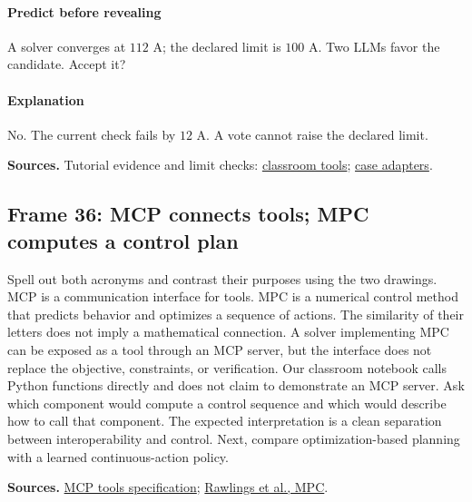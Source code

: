 \documentclass[11pt]{article}
\begin{document}
\paragraph{Predict before revealing}A solver converges at \(112\) A; the declared limit is \(100\) A. Two LLMs favor the candidate. Accept it?
\paragraph{Explanation}No. The current check fails by \(12\) A. A vote cannot raise the declared limit.
\par\nopagebreak\begin{minipage}{\linewidth}{\footnotesize\color{slate}\textbf{Sources.} Tutorial evidence and limit checks: \href{../src/classroom_labs.py}{classroom tools}; \href{../src/proposal_case_tools.py}{case adapters}.\par}\end{minipage}\par\medskip
\subsection*{Frame 36: MCP connects tools; MPC computes a control plan}
Spell out both acronyms and contrast their purposes using the two drawings. MCP is a communication interface for tools. MPC is a numerical control method that predicts behavior and optimizes a sequence of actions. The similarity of their letters does not imply a mathematical connection. A solver implementing MPC can be exposed as a tool through an MCP server, but the interface does not replace the objective, constraints, or verification. Our classroom notebook calls Python functions directly and does not claim to demonstrate an MCP server. Ask which component would compute a control sequence and which would describe how to call that component. The expected interpretation is a clean separation between interoperability and control. Next, compare optimization-based planning with a learned continuous-action policy.\par
\par\nopagebreak\begin{minipage}{\linewidth}{\footnotesize\color{slate}\textbf{Sources.} \href{https://modelcontextprotocol.io/specification/2025-11-25/server/tools}{MCP tools specification}; \href{https://sites.engineering.ucsb.edu/~jbraw/mpc/}{Rawlings et al., MPC}.\par}\end{minipage}\par\medskip
\end{document}
